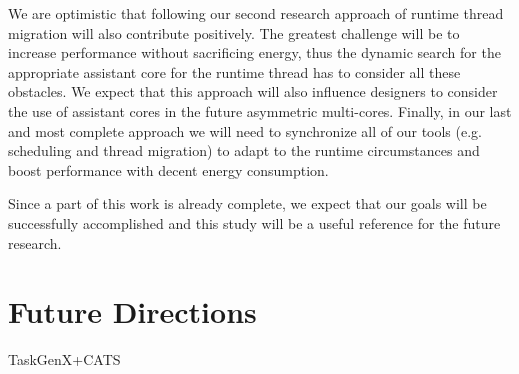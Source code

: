 We are optimistic that following our second research approach of runtime thread migration will also contribute positively.
The greatest challenge will be to increase performance without sacrificing energy, thus the dynamic search for the appropriate assistant core for the runtime thread has to consider all these obstacles.
We expect that this approach will also influence designers to consider the use of assistant cores in the future asymmetric multi-cores.
Finally, in our last and most complete approach we will need to synchronize all of our tools (e.g. scheduling and thread migration) to adapt to the runtime circumstances and boost performance with decent energy consumption.

Since a part of this work is already complete, we expect that our goals will be successfully accomplished and this study will be a useful reference for the future research.









\section{Future Directions}

TaskGenX+CATS
